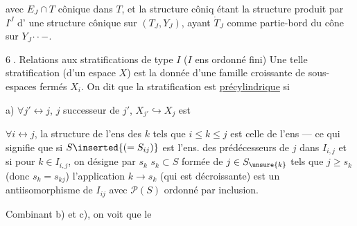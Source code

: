 avec $E_J\cap T$ cônique dans $T$, et la structure côniq
 étant la structure produit par $I^J$ d'
une structure cônique sur $(T_J,Y_J)$, ayant
$\dot T_J$ comme partie-bord du cône sur $Y_J$\(\mathinner{\cdotp\cdotp-}\).


\textcircled{6.} Relations aux stratifications de type $I$
($I$ ens ordonné fini)
Une telle stratification (d'un espace $X$) est
la donnée d'une famille croissante de
sous-espaces fermés $X_i$. On dit que
la stratification est \uline{précylindrique} si

a) $\forall j'\leftrightarrow j$, $j$ successeur de $j'$,
$X_{j'}\hookrightarrow X_j$ est
 



$\forall i\leftrightarrow j$, la structure de l'ens 
des $k$ tels que $i\le k\le j$ est celle de l'ens
  --- ce qui signifie que
si $S\inserted{(=S_{ij})}$ est l'ens. des prédécesseurs de $j$ dans
$I_{i,j}$ 
et si pour \unsure{$\forall$} $k\in I_{i,j}$, on désigne
 par $s_k$   $s_k\subset S$ formée
de $j\in S_{\unsure{k}}$ tels que
$j\ge s_k$ (donc $s_k=s_{kj}$)
l'application $k\longrightarrow s_k$ (qui est décroissante)
est un antiisomorphisme de $I_{ij}$ avec $\mathcal P(S)$
ordonné par inclusion. 




Combinant b) et c), on voit que le
